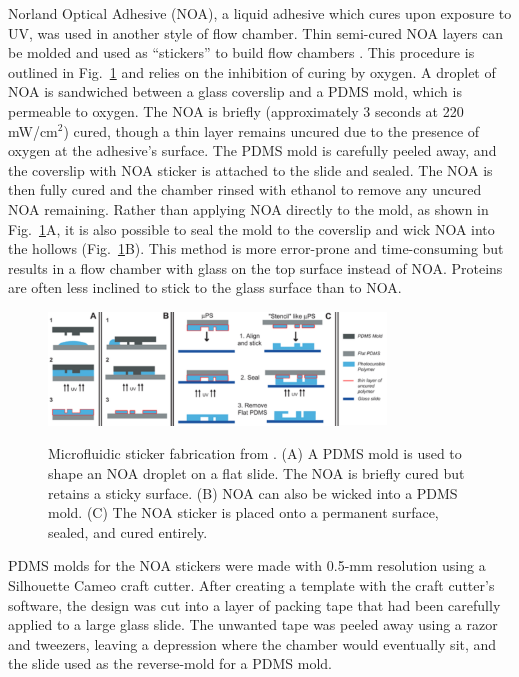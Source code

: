 Norland Optical Adhesive (NOA), a liquid adhesive which cures upon exposure to UV, was used in another style of flow chamber.  Thin semi-cured NOA layers can be molded and used as ``stickers'' to build flow chambers \cite{bartolo08, paustian13}.  This procedure is outlined in Fig.~\ref{fig:stickers} and relies on the inhibition of curing by oxygen.  A droplet of NOA is sandwiched between a glass coverslip and a PDMS mold, which is permeable to oxygen. The NOA is briefly (approximately 3 seconds at 220 mW/cm$^2$) cured, though a thin layer remains uncured due to the presence of oxygen at the adhesive's surface. The PDMS mold is carefully peeled away, and the coverslip with NOA sticker is attached to the slide and sealed.  The NOA is then fully cured and the chamber rinsed with ethanol to remove any uncured NOA remaining. Rather than applying NOA directly to the mold, as shown in Fig.~\ref{fig:stickers}A, it is also possible to seal the mold to the coverslip and wick NOA into the hollows (Fig.~\ref{fig:stickers}B).  This method is more error-prone and time-consuming but results in a flow chamber with glass on the top surface instead of NOA.  Proteins are often less inclined to stick to the glass surface than to NOA.

\begin{figure}
\caption[Microfluidic sticker fabrication.]{Microfluidic sticker fabrication from \cite{bartolo08}. (A) A PDMS mold is used to shape an NOA droplet on a flat slide.  The NOA is briefly cured but retains a sticky surface.  (B) NOA can also be wicked into a PDMS mold. (C) The NOA sticker is placed onto a permanent surface, sealed, and cured entirely.}
\centering
\includegraphics[width=0.8\textwidth]{figs/ch03/sticker-bartolo.pdf}
\label{fig:stickers}
\end{figure}

PDMS molds for the NOA stickers were made with 0.5-mm resolution using a Silhouette Cameo craft cutter.  After creating a template with the craft cutter's software, the design was cut into a layer of packing tape that had been carefully applied to a large glass slide. The unwanted tape was peeled away using a razor and tweezers, leaving a depression where the chamber would eventually sit, and the slide used as the reverse-mold for a PDMS mold.

